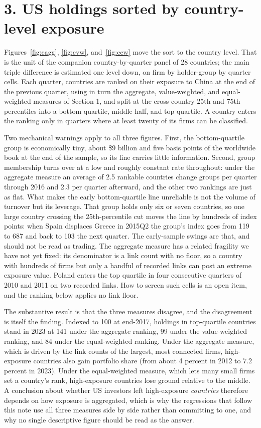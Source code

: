 \documentclass[11pt]{article}
\begin{document}
\section*{3. US holdings sorted by country-level exposure}

Figures~\ref{fig:cagg}, \ref{fig:cvw}, and~\ref{fig:cew} move the sort to the
country level. That is the unit of the companion country-by-quarter panel of
28 countries; the main triple difference is estimated one level down, on firm
by holder-group by quarter cells. Each quarter, countries are
ranked on their exposure to China at the end of the previous quarter, using
in turn the aggregate, value-weighted, and equal-weighted measures of
Section 1, and split at the cross-country 25th and 75th percentiles into a
bottom quartile, middle half, and top quartile. A country enters the ranking
only in quarters where at least twenty of its firms can be classified.

Two mechanical warnings apply to all three figures. First, the bottom-quartile
group is economically tiny, about \$9 billion and five basis points of the
worldwide book at the end of the sample, so its line carries little
information. Second, group membership turns over at a low and
roughly constant rate throughout: under the aggregate measure an
average of 2.5 rankable countries change groups per quarter through 2016 and
2.3 per quarter afterward, and the other two rankings are just as flat. What
makes the early bottom-quartile line unreliable is not the volume of turnover
but its leverage. That group holds only six or seven countries, so one large
country crossing the 25th-percentile cut moves the line by hundreds of index
points: when Spain displaces Greece in 2015Q2 the group's index goes from 119
to 687 and back to 103 the next quarter. The early-sample swings are that, and
should not be read as trading. The aggregate measure has a related fragility
we have not yet fixed: its denominator is a link count with no floor, so a
country with hundreds of firms but only a handful of recorded links can post
an extreme exposure value. Poland enters the top quartile in four consecutive
quarters of 2010 and 2011 on two recorded links. How to screen such cells is
an open item, and the ranking below applies no link floor.

The substantive result is that the three measures disagree, and the
disagreement is itself the finding. Indexed to 100 at end-2017, holdings in
top-quartile countries stand in 2023 at 141 under the aggregate ranking, 99
under the value-weighted ranking, and 84 under the equal-weighted ranking.
Under the aggregate measure, which is driven by the link counts of the
largest, most connected firms, high-exposure countries also gain portfolio
share (from about 4 percent in 2012 to 7.2 percent in 2023). Under the
equal-weighted measure, which lets many small firms set a country's rank,
high-exposure countries lose ground relative to the middle. A conclusion
about whether US investors left high-exposure \emph{countries} therefore
depends on how exposure is aggregated, which is why the regressions that
follow this note use all three measures side by side rather than committing
to one, and why no single descriptive figure should be read as the answer.
\end{document}
